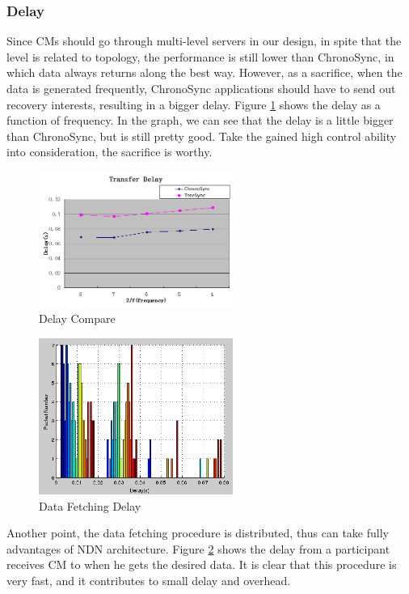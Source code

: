 \documentclass[conference]{IEEEtran}
\begin{document}
\subsubsection{Delay}
Since CMs should go through multi-level servers in our design,
in spite that the level is related to topology,
the performance is still lower than ChronoSync,
in which data always returns along the best way.
However, as a sacrifice, when the data is generated frequently,
ChronoSync applications should have to send out recovery interests,
resulting in a bigger delay. Figure \ref{delay_compare}
shows the delay as a function of frequency.
In the graph, we can see that the delay is a little bigger than ChronoSync,
but is still pretty good. Take the gained high control ability into consideration,
the sacrifice is worthy.
\begin{figure}[!t]
\centering
\includegraphics[width=2.5in]{../png/delay-compare-revised.png}
\caption{Delay Compare}
\label{delay_compare}
\end{figure}

\begin{figure}[!t]
\centering
\includegraphics[width=2.5in]{../png/data-fetch-delay.png}
\caption{Data Fetching Delay}
\label{data_fetch_delay}
\end{figure}
Another point, the data fetching procedure is distributed,
thus can take fully advantages of NDN architecture.
Figure \ref{data_fetch_delay} shows the delay from a participant
receives CM to when he gets the desired data.
It is clear that this procedure is very fast,
and it contributes to small delay and overhead.
\end{document}
